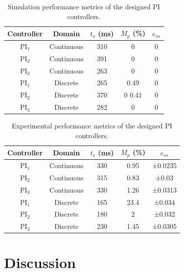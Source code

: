 \documentclass[conference]{IEEEtran}
\begin{document}
\begin{table}[H]
    \centering
    \caption{Simulation performance metrics of the designed PI controllers.}
    \label{tab:sim_performance}
    \begin{tabular}{ccccc}
        \toprule
        \textbf{Controller} & \textbf{Domain} &
        \textbf{$t_s$ (ms)} & \textbf{$M_p$ (\%)} &
        \textbf{$e_{ss}$} \\
        \midrule
        PI$_1$ & Continuous & 310  & 0    & 0 \\
        PI$_2$ & Continuous & 391  & 0    & 0 \\
        PI$_3$ & Continuous &  263    &  0    &  0 \\
        \midrule
        PI$_1$ & Discrete   & 265  & 0.49 & 0 \\
        PI$_2$ & Discrete   & 370  & 0  0.41  & 0 \\
        PI$_3$ & Discrete   & 282   &     0 &  0 \\
        \bottomrule
    \end{tabular}
\end{table}

\begin{table}[H]
    \centering
    \caption{Experimental performance metrics of the designed PI controllers.}
    \label{tab:exp_performance}
    \begin{tabular}{ccccc}
        \toprule
        \textbf{Controller} & \textbf{Domain} &
        \textbf{$t_s$ (ms)} & \textbf{$M_p$ (\%)} &
        \textbf{$e_{ss}$} \\
        \midrule
        PI$_1$ & Continuous & 330 & 0.95 & ±0.0235 \\
        PI$_2$ & Continuous & 315 & 0.83 & ±0.03 \\
        PI$_3$ & Continuous & 330 & 1.26 & ±0.0313 \\
        \midrule
        PI$_1$ & Discrete   & 165 & 23.4 & ±0.034 \\
        PI$_2$ & Discrete   & 180 & 2 & ±0.032 \\
        PI$_3$ & Discrete   & 230 & 1.45 & ±0.0305 \\
        \bottomrule
    \end{tabular}
\end{table}


\section{Discussion}
\end{document}
